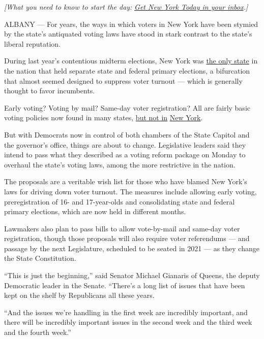 \emph{{[}What you need to know to start the day:}
\href{https://www.nytimes3xbfgragh.onion/newsletters/newyorktoday?module=inline}{\emph{Get
New York Today in your inbox}}\emph{.{]}}

ALBANY --- For years, the ways in which voters in New York have been
stymied by the state's antiquated voting laws have stood in stark
contrast to the state's liberal reputation.

During last year's contentious midterm elections, New York was
\href{https://www.nytimes3xbfgragh.onion/2018/06/25/nyregion/new-york-primary-congress-state-federal.html}{the
only state} in the nation that held separate state and federal primary
elections, a bifurcation that almost seemed designed to suppress voter
turnout --- which is generally thought to favor incumbents.

Early voting? Voting by mail? Same-day voter registration? All are
fairly basic voting policies now found in many states,
\href{https://www.nytimes3xbfgragh.onion/2018/12/19/nyregion/early-voting-reform-laws-ny.html}{but
not in}
\href{https://www.nytimes3xbfgragh.onion/2018/12/19/nyregion/early-voting-reform-laws-ny.html}{New
York}.

But with Democrats now in control of both chambers of the State Capitol
and the governor's office, things are about to change. Legislative
leaders said they intend to pass what they described as a voting reform
package on Monday to overhaul the state's voting laws, among the more
restrictive in the nation.

The proposals are a veritable wish list for those who have blamed New
York's laws for driving down voter turnout. The measures include
allowing early voting, preregistration of 16- and 17-year-olds and
consolidating state and federal primary elections, which are now held in
different months.

Lawmakers also plan to pass bills to allow vote-by-mail and same-day
voter registration, though those proposals will also require voter
referendums --- and passage by the next Legislature, scheduled to be
seated in 2021 --- as they change the State Constitution.

``This is just the beginning,'' said Senator Michael Gianaris of Queens,
the deputy Democratic leader in the Senate. ``There's a long list of
issues that have been kept on the shelf by Republicans all these years.

``And the issues we're handling in the first week are incredibly
important, and there will be incredibly important issues in the second
week and the third week and the fourth week.''

